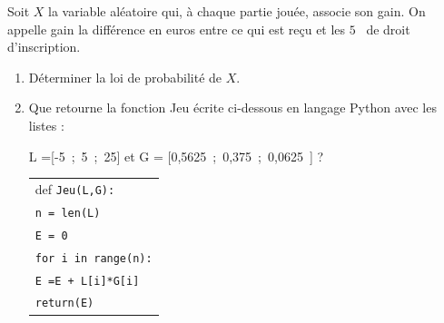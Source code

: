 \documentclass[10pt]{article}
\providecommand{\euro}{\texteuro}
\providecommand{\np}[2][]{{#2~#1}}
\providecommand{\euro}{{\text{€}}}
\renewcommand{\euro}{\ifmmode\text{\texteuro}\else\texteuro\fi}
\begin{document}
\smallskip

Soit $X$ la variable aléatoire qui, à chaque partie jouée, associe son gain. On appelle gain la différence en euros entre ce qui est reçu et les $5$~\euro{} de droit d'inscription.

\medskip

\begin{enumerate}
\item Déterminer la loi de probabilité de $X$.
\item Que retourne la fonction Jeu écrite ci-dessous en langage Python
avec les listes : 

L =[-5~;~5~;~25] et G = [0,5625~;~0,375~;~\np{0,0625}] ?

\begin{center}

\begin{tabularx}{0.4\linewidth}{|X|}\hline
def \texttt{Jeu(L,G):}\\
\quad  \texttt{n = len(L)}\\
\quad \texttt{E = 0}\\
\quad \texttt{for i in range(n):}\\
\qquad \texttt{E =E + L[i]*G[i]} \\
\quad \texttt{return(E)}\\ \hline
\end{tabularx}
\end{center}
\end{enumerate}

\bigskip
\end{document}
